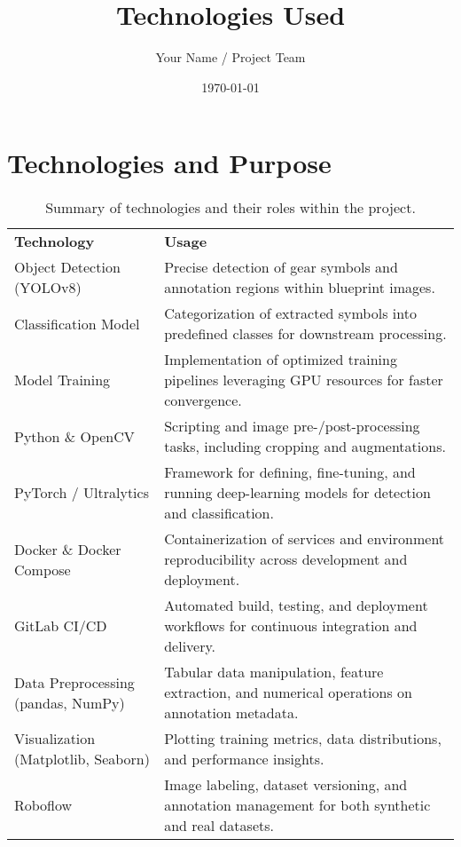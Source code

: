 \documentclass[a4paper,12pt]{article}
\title{Technologies Used}
\author{Your Name / Project Team}
\date{\today}
\begin{document}
\maketitle

\section*{Technologies and Purpose}

\begin{table}[h!]
  \centering
  \begin{tabular}{p{} p{}}
    \textbf{Technology} & \textbf{Usage} \\
    Object Detection (YOLOv8) & Precise detection of gear symbols and annotation regions within blueprint images. \\
    Classification Model & Categorization of extracted symbols into predefined classes for downstream processing. \\
    Model Training & Implementation of optimized training pipelines leveraging GPU resources for faster convergence. \\
    Python \& OpenCV & Scripting and image pre-/post-processing tasks, including cropping and augmentations. \\
    PyTorch / Ultralytics & Framework for defining, fine-tuning, and running deep-learning models for detection and classification. \\
    Docker \& Docker Compose & Containerization of services and environment reproducibility across development and deployment. \\
    GitLab CI/CD & Automated build, testing, and deployment workflows for continuous integration and delivery. \\
    Data Preprocessing (pandas, NumPy) & Tabular data manipulation, feature extraction, and numerical operations on annotation metadata. \\
    Visualization (Matplotlib, Seaborn) & Plotting training metrics, data distributions, and performance insights. \\
    Roboflow & Image labeling, dataset versioning, and annotation management for both synthetic and real datasets. \\
  \end{tabular}
  \caption{Summary of technologies and their roles within the project.}
  \label{tab:technologies}
\end{table}
\end{document}
